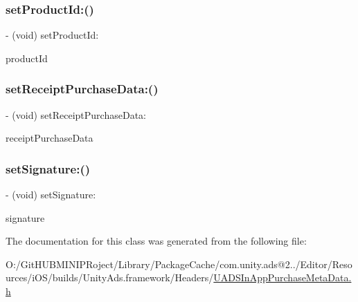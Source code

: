 \subsubsection{\texorpdfstring{setProductId:()}{setProductId:()}}
{\footnotesize\ttfamily -\/ (void) set\+Product\+Id\+: \begin{DoxyParamCaption}\item[{(N\+S\+String $\ast$)}]{product\+Id }\end{DoxyParamCaption}}

\mbox{\label{interface_u_a_d_s_in_app_purchase_meta_data_ab75898c99eb5b179acadf4913751359f}} 
\subsubsection{\texorpdfstring{setReceiptPurchaseData:()}{setReceiptPurchaseData:()}}
{\footnotesize\ttfamily -\/ (void) set\+Receipt\+Purchase\+Data\+: \begin{DoxyParamCaption}\item[{(N\+S\+String $\ast$)}]{receipt\+Purchase\+Data }\end{DoxyParamCaption}}

\mbox{\label{interface_u_a_d_s_in_app_purchase_meta_data_ac74a27c24ce21d0b675a0a9231756b1b}} 
\subsubsection{\texorpdfstring{setSignature:()}{setSignature:()}}
{\footnotesize\ttfamily -\/ (void) set\+Signature\+: \begin{DoxyParamCaption}\item[{(N\+S\+String $\ast$)}]{signature }\end{DoxyParamCaption}}



The documentation for this class was generated from the following file\+:\begin{DoxyCompactItemize}
\item 
O\+:/\+Git\+H\+U\+B\+M\+I\+N\+I\+P\+Roject/\+Library/\+Package\+Cache/com.\+unity.\+ads@2../\+Editor/\+Resources/i\+O\+S/builds/\+Unity\+Ads.\+framework/\+Headers/\mbox{\hyperlink{_u_a_d_s_in_app_purchase_meta_data_8h}{U\+A\+D\+S\+In\+App\+Purchase\+Meta\+Data.\+h}}\end{DoxyCompactItemize}
